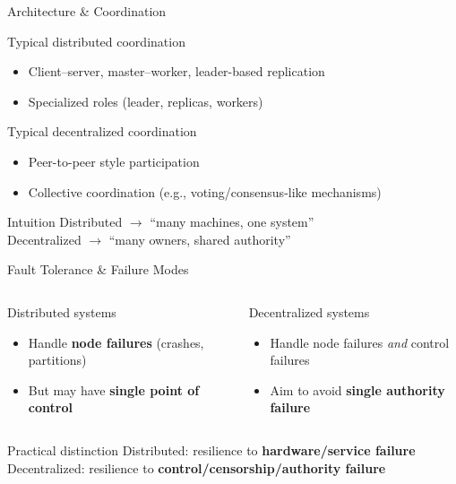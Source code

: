 \begin{frame}{Architecture \& Coordination}
  \begin{block}{Typical distributed coordination}
    \begin{itemize}
      \item Client--server, master--worker, leader-based replication
      \item Specialized roles (leader, replicas, workers)
    \end{itemize}
  \end{block}

  \begin{block}{Typical decentralized coordination}
    \begin{itemize}
      \item Peer-to-peer style participation
      \item Collective coordination (e.g., voting/consensus-like mechanisms)
    \end{itemize}
  \end{block}

  \begin{exampleblock}{Intuition}
    Distributed $\rightarrow$ ``many machines, one system'' \\
    Decentralized $\rightarrow$ ``many owners, shared authority''
  \end{exampleblock}
\end{frame}

\begin{frame}{Fault Tolerance \& Failure Modes}
  \begin{columns}[T,onlytextwidth]
    \begin{block}{Distributed systems}
      \begin{itemize}
        \item Handle \textbf{node failures} (crashes, partitions)
        \item But may have \textbf{single point of control}
      \end{itemize}
    \end{block}

    \begin{block}{Decentralized systems}
      \begin{itemize}
        \item Handle node failures \emph{and} control failures
        \item Aim to avoid \textbf{single authority failure}
      \end{itemize}
    \end{block}
  \end{columns}

  \begin{alertblock}{Practical distinction}
    Distributed: resilience to \textbf{hardware/service failure} \\
    Decentralized: resilience to \textbf{control/censorship/authority failure}
  \end{alertblock}
\end{frame}

